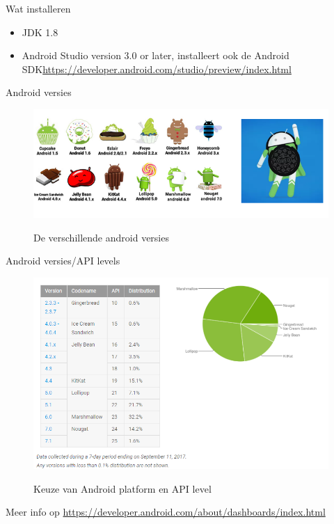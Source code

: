 \documentclass{beamer}
\begin{document}
\begin{frame}{Wat installeren}
\begin{itemize}

	\item JDK 1.8
	\item Android Studio version 3.0 or later, installeert ook de Android SDK\break \url{https://developer.android.com/studio/preview/index.html}
		\end{itemize}	

\end{frame}

\begin{frame}{Android versies }
\begin{figure}[ht]
	\centering
	\includegraphics[width=\textwidth]{img/hello/android_versies.png}
	\label{fig:android versies}
	\caption{De verschillende android versies}
\end{figure}	
\end{frame}

\begin{frame}{Android versies/API levels }
\begin{figure}[ht]
	\centering
	\includegraphics[width=\textwidth]{img/hello/api_levels.png}
	\label{fig:apilevels}
	\caption{Keuze van Android platform en API level}
\end{figure}
Meer info op \url{https://developer.android.com/about/dashboards/index.html
}	
\end{frame}
\end{document}
